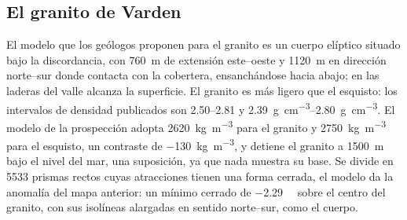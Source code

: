\begin{omfigure}
\par{}\label{fig:b3:field-lab-methods-3:survey}
\end{omfigure}

\subsection{El granito de Varden}

El modelo que los geólogos proponen para el granito es un cuerpo elíptico situado bajo la
discordancia, con \qty{760}{m} de extensión este--oeste y \qty{1120}{m}
en dirección norte--sur donde contacta con la cobertera, ensanchándose hacia abajo; en las
laderas del valle alcanza la superficie. El granito es más ligero que el esquisto:
los intervalos de densidad publicados son \numrange{2.50}{2.81} y
\qtyrange{2.39}{2.80}{g.cm^{-3}}. El modelo de la prospección adopta
\qty{2620}{kg.m^{-3}} para el granito y \qty{2750}{kg.m^{-3}} para el
esquisto, un contraste de \qty{-130}{kg.m^{-3}}, y detiene el granito a
\qty{1500}{m} bajo el nivel del mar, una suposición, ya que nada muestra su
base. Se divide en \num{5533} prismas rectos cuyas atracciones tienen una
forma cerrada, el modelo da la anomalía del mapa anterior: un mínimo cerrado de
\qty{-2.29}{\milli\gal} sobre el centro del granito, con sus isolíneas
alargadas en sentido norte--sur, como el cuerpo.

